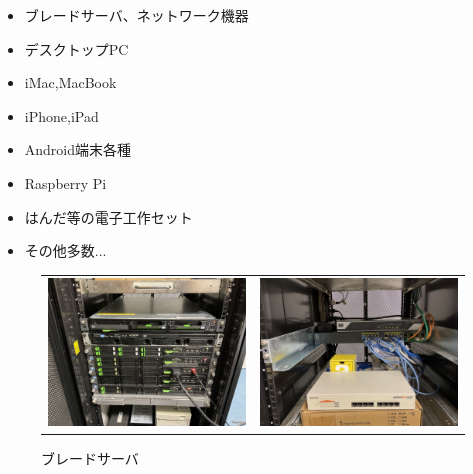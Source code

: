 \begin{tcolorbox}[title=シス研の設備]
  \begin{itemize}
    \item ブレードサーバ、ネットワーク機器
    \item デスクトップPC
    \item iMac,MacBook
    \item iPhone,iPad
    \item Android端末各種
    \item Raspberry Pi
    \item はんだ等の電子工作セット
    \item その他多数...
  \end{itemize} 
\end{tcolorbox}

\begin{figure}[H]
  \begin{tabular}{cc}
    \begin{minipage}[b]{0.40\columnwidth}
      \centering
      \includegraphics[width=\columnwidth]{./image/02-AboutSysken/server.jpg}
      \caption{ブレードサーバ}
    \end{minipage} &
    \hspace{0.04\columnwidth}
    \begin{minipage}[b]{0.40\columnwidth}
      \centering
      \includegraphics[width=\columnwidth]{./image/02-AboutSysken/network.jpg}

\end{minipage}
\end{tabular}
\end{figure}
